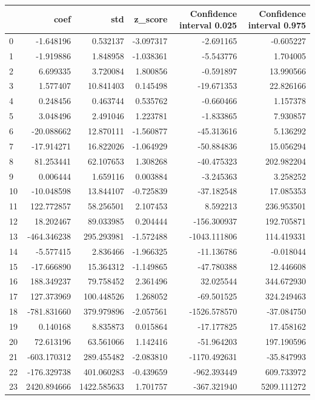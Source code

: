 \FloatBarrier
\begin{table}
	
	\begin{tabular}{lrrrrr}
		\toprule
		{} &         coef &          std &   z\_score &        Confidence interval 0.025 &        Confidence interval 0.975 \\
		\midrule
		0  &    -1.648196 &     0.532137 & -3.097317 &    -2.691165 &    -0.605227 \\
		1  &    -1.919886 &     1.848958 & -1.038361 &    -5.543776 &     1.704005 \\
		2  &     6.699335 &     3.720084 &  1.800856 &    -0.591897 &    13.990566 \\
		3  &     1.577407 &    10.841403 &  0.145498 &   -19.671353 &    22.826166 \\
		4  &     0.248456 &     0.463744 &  0.535762 &    -0.660466 &     1.157378 \\
		5  &     3.048496 &     2.491046 &  1.223781 &    -1.833865 &     7.930857 \\
		6  &   -20.088662 &    12.870111 & -1.560877 &   -45.313616 &     5.136292 \\
		7  &   -17.914271 &    16.822026 & -1.064929 &   -50.884836 &    15.056294 \\
		8  &    81.253441 &    62.107653 &  1.308268 &   -40.475323 &   202.982204 \\
		9  &     0.006444 &     1.659116 &  0.003884 &    -3.245363 &     3.258252 \\
		10 &   -10.048598 &    13.844107 & -0.725839 &   -37.182548 &    17.085353 \\
		11 &   122.772857 &    58.256501 &  2.107453 &     8.592213 &   236.953501 \\
		12 &    18.202467 &    89.033985 &  0.204444 &  -156.300937 &   192.705871 \\
		13 &  -464.346238 &   295.293981 & -1.572488 & -1043.111806 &   114.419331 \\
		14 &    -5.577415 &     2.836466 & -1.966325 &   -11.136786 &    -0.018044 \\
		15 &   -17.666890 &    15.364312 & -1.149865 &   -47.780388 &    12.446608 \\
		16 &   188.349237 &    79.758452 &  2.361496 &    32.025544 &   344.672930 \\
		17 &   127.373969 &   100.448526 &  1.268052 &   -69.501525 &   324.249463 \\
		18 &  -781.831660 &   379.979896 & -2.057561 & -1526.578570 &   -37.084750 \\
		19 &     0.140168 &     8.835873 &  0.015864 &   -17.177825 &    17.458162 \\
		20 &    72.613196 &    63.561066 &  1.142416 &   -51.964203 &   197.190596 \\
		21 &  -603.170312 &   289.455482 & -2.083810 & -1170.492631 &   -35.847993 \\
		22 &  -176.329738 &   401.060283 & -0.439659 &  -962.393449 &   609.733972 \\
		23 &  2420.894666 &  1422.585633 &  1.701757 &  -367.321940 &  5209.111272 \\
		\bottomrule
		

\end{tabular}
\end{table}
